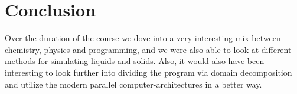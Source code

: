 \chapter{Conclusion}
\begin{comment}
- give look at stuff i did and did not
- mention all the other cool stuff, parralell hardware memes domain decompasition looking at other mechanical parameters ia stress
- should be written nice if i wanna work with those guys
-btw the github is actually hilarious although a c++ project over 80%
- personal ?! nah
\end{comment}

Over the duration of the course we dove into a very interesting mix between chemistry, physics and programming, and we were also able to look at different methods for simulating liquids and solids. Also, it would also have been interesting to look further into dividing the program via domain decomposition and utilize the modern parallel computer-architectures in a better way. 
